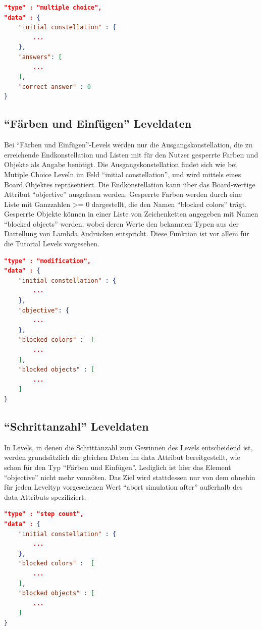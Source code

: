 \begin{lstlisting}[language=json,caption={Grober Aufbau des data Attributs eines Multiple Choice Levels}]
"type" : "multiple choice",
"data" : {
	"initial constellation" : {
		...
	},
	"answers": [
		...
	],
	"correct answer" : 0
}
\end{lstlisting}

\subsection{"`Färben und Einfügen"' Leveldaten}
Bei "`Färben und Einfügen"'-Levels werden nur die Ausgangskonstellation, die zu erreichende Endkonstellation und Listen mit für den Nutzer gesperrte Farben und Objekte als Angabe benötigt.
Die Ausgangskonstellation findet sich wie bei Mutiple Choice Leveln im Feld "`initial constellation"', und wird mittels eines Board Objektes repräsentiert.
Die Endkonstellation kann über das Board-wertige Attribut "`objective"' ausgelesen werden.
Gesperrte Farben werden durch eine Liste mit Ganzzahlen >= 0 dargestellt, die den Namen "`blocked colors"' trägt.
Gesperrte Objekte können in einer Liste von Zeichenketten angegeben mit Namen "`blocked objects"' werden, wobei deren Werte den bekannten Typen aus der Dartellung von Lambda Audrücken entspricht.
Diese Funktion ist vor allem für die Tutorial Levels vorgesehen.

\begin{lstlisting}[language=json,caption={Grober Aufbau des data Attributs eines "`Färben und Einfügen"' Levels}]
"type" : "modification",
"data" : {
	"initial constellation" : {
		...
	},
	"objective": {
		...
	},
	"blocked colors" :  [
		...
	],
	"blocked objects" : [
		...
	]
}
\end{lstlisting}

\subsection{"`Schrittanzahl"' Leveldaten}
In Levels, in denen die Schrittanzahl zum Gewinnen des Levels entscheidend ist, werden grundsätzlich die gleichen Daten im data Attribut bereitgestellt, wie schon für den Typ "`Färben und Einfügen"'.
Lediglich ist hier das Element "`objective"' nicht mehr vonnöten.
Das Ziel wird stattdessen nur von dem ohnehin für jeden Leveltyp vorgesehenen Wert "`abort simulation after"' außerhalb des data Attributs spezifiziert.

\begin{lstlisting}[language=json,caption={Grober Aufbau des data Attributs eines "`Schrittzahl"' Levels}]
"type" : "step count",
"data" : {
	"initial constellation" : {
		...
	},
	"blocked colors" :  [
		...
	],
	"blocked objects" : [
		...
	]
}
\end{lstlisting}

